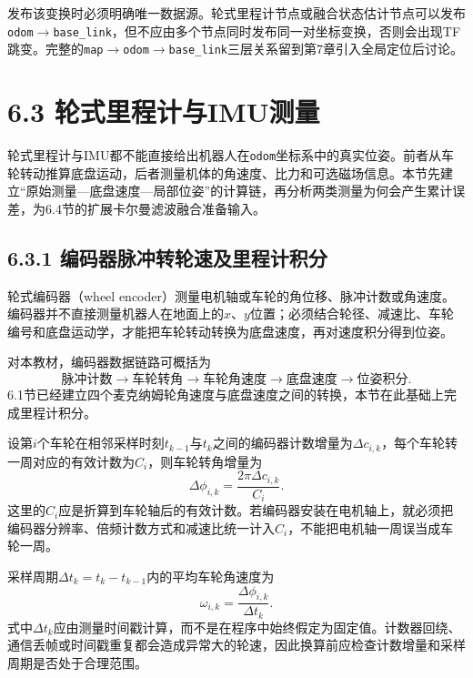 \documentclass[UTF8,zihao=-4]{ctexart}
\begin{document}
发布该变换时必须明确唯一数据源。轮式里程计节点或融合状态估计节点可以发布\texttt{odom}$\rightarrow$\texttt{base\_link}，但不应由多个节点同时发布同一对坐标变换，否则会出现TF跳变。完整的\texttt{map}$\rightarrow$\texttt{odom}$\rightarrow$\texttt{base\_link}三层关系留到第7章引入全局定位后讨论。
\section*{6.3 轮式里程计与IMU测量}

轮式里程计与IMU都不能直接给出机器人在\texttt{odom}坐标系中的真实位姿。前者从车轮转动推算底盘运动，后者测量机体的角速度、比力和可选磁场信息。本节先建立“原始测量---底盘速度---局部位姿”的计算链，再分析两类测量为何会产生累计误差，为6.4节的扩展卡尔曼滤波融合准备输入。

\subsection*{6.3.1 编码器脉冲转轮速及里程计积分}

轮式编码器（wheel encoder）测量电机轴或车轮的角位移、脉冲计数或角速度。编码器并不直接测量机器人在地面上的$x$、$y$位置；必须结合轮径、减速比、车轮编号和底盘运动学，才能把车轮转动转换为底盘速度，再对速度积分得到位姿。

对本教材，编码器数据链路可概括为
\begin{equation}
  \text{脉冲计数}
  \rightarrow \text{车轮转角}
  \rightarrow \text{车轮角速度}
  \rightarrow \text{底盘速度}
  \rightarrow \text{位姿积分}.
  \label{eq:encoder-chain}
\end{equation}
6.1节已经建立四个麦克纳姆轮角速度与底盘速度之间的转换，本节在此基础上完成里程计积分。

设第$i$个车轮在相邻采样时刻$t_{k-1}$与$t_k$之间的编码器计数增量为$\Delta c_{i,k}$，每个车轮转一周对应的有效计数为$C_i$，则车轮转角增量为
\begin{equation}
  \Delta\phi_{i,k}=\frac{2\pi\Delta c_{i,k}}{C_i}.
  \label{eq:encoder-count-to-angle}
\end{equation}
这里的$C_i$应是折算到车轮轴后的有效计数。若编码器安装在电机轴上，就必须把编码器分辨率、倍频计数方式和减速比统一计入$C_i$，不能把电机轴一周误当成车轮一周。

采样周期$\Delta t_k=t_k-t_{k-1}$内的平均车轮角速度为
\begin{equation}
  \omega_{i,k}=\frac{\Delta\phi_{i,k}}{\Delta t_k}.
  \label{eq:encoder-angle-to-speed}
\end{equation}
式中$\Delta t_k$应由测量时间戳计算，而不是在程序中始终假定为固定值。计数器回绕、通信丢帧或时间戳重复都会造成异常大的轮速，因此换算前应检查计数增量和采样周期是否处于合理范围。
\end{document}
